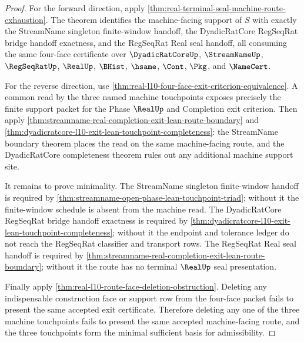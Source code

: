 \begin{proof}
For the forward direction, apply \autoref{thm:real-terminal-seal-machine-route-exhaustion}. The theorem identifies the machine-facing support of $S$ with exactly the StreamName singleton finite-window handoff, the DyadicRatCore RegSeqRat bridge handoff exactness, and the RegSeqRat Real seal handoff, all consuming the same four-face certificate over $\DyadicRatCoreUp$, $\StreamNameUp$, $\RegSeqRatUp$, $\RealUp$, $\BHist$, $\hsame$, $\Cont$, $\Pkg$, and $\NameCert$.

For the reverse direction, use \autoref{thm:real-l10-four-face-exit-criterion-equivalence}. A common read by the three named machine touchpoints exposes precisely the finite support packet for the Phase $\RealUp$ and Completion exit criterion. Then apply \autoref{thm:streamname-real-completion-exit-lean-route-boundary} and \autoref{thm:dyadicratcore-l10-exit-lean-touchpoint-completeness}: the StreamName boundary theorem places the read on the same machine-facing route, and the DyadicRatCore completeness theorem rules out any additional machine support site.

It remains to prove minimality. The StreamName singleton finite-window handoff is required by \autoref{thm:streamname-open-phase-lean-touchpoint-triad}; without it the finite-window schedule is absent from the machine read. The DyadicRatCore RegSeqRat bridge handoff exactness is required by \autoref{thm:dyadicratcore-l10-exit-lean-touchpoint-completeness}; without it the endpoint and tolerance ledger do not reach the RegSeqRat classifier and transport rows. The RegSeqRat Real seal handoff is required by \autoref{thm:streamname-real-completion-exit-lean-route-boundary}; without it the route has no terminal $\RealUp$ seal presentation.

Finally apply \autoref{thm:real-l10-route-face-deletion-obstruction}. Deleting any indispensable construction face or support row from the four-face packet fails to present the same accepted exit certificate. Therefore deleting any one of the three machine touchpoints fails to present the same accepted machine-facing route, and the three touchpoints form the minimal sufficient basis for admissibility.
\end{proof}

